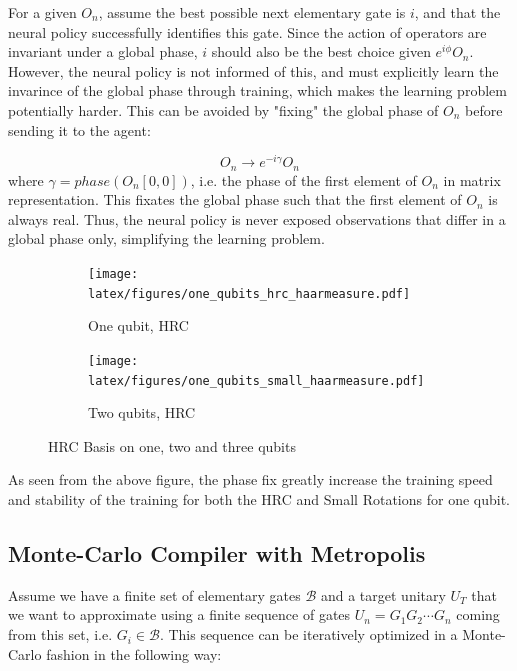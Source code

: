 \documentclass{article}
\begin{document}
For a given $O_n$, assume the best possible next elementary gate is $i$, and that the neural policy successfully identifies this gate. Since the action of operators are invariant under a global phase, $i$ should also be the best choice given $e^{i\phi}O_n$. However, the neural policy is not informed of this, and must explicitly learn the invarince of the global phase through training, which makes the learning problem potentially harder. This can be avoided by "fixing" the global phase of $O_n$ before sending it to the agent:

\begin{equation*}
    O_n \rightarrow e^{-i\gamma}O_n
\end{equation*}
where $\gamma = phase(O_n[0,0])$, i.e. the phase of the first element of $O_n$ in matrix representation. This fixates the global phase such that the first element of $O_n$ is always real. Thus, the neural policy is never exposed observations that differ in a global phase only, simplifying the learning problem.

\begin{figure}[H]
\begin{subfigure}{.5\textwidth} 
    \centering
    \texttt{[image: latex/figures/one\_qubits\_hrc\_haarmeasure.pdf]}  %
    \caption{One qubit, HRC}
    \label{fig:sub-first}
\end{subfigure}
\begin{subfigure}{.5\textwidth}
    \centering
    \texttt{[image: latex/figures/one\_qubits\_small\_haarmeasure.pdf]}  
    \caption{Two qubits, HRC}
    \label{fig:sub-second}
\end{subfigure}
\caption{HRC Basis on one, two and three qubits}
\label{fig:RL phase fix}
\end{figure}

As seen from the above figure, the phase fix greatly increase the training speed and stability of the training for both the HRC and Small Rotations for one qubit.

\subsection{Monte-Carlo Compiler with Metropolis}
Assume we have a finite set of elementary gates $\mathcal{B}$ and a target unitary $U_T$ that we want to approximate using a finite sequence of gates $U_n = G_1 G_2 \cdots G_n$ coming from this set, i.e. $G_i \in \mathcal{B}$. This sequence can be iteratively optimized in a Monte-Carlo fashion in the following way:
\end{document}
